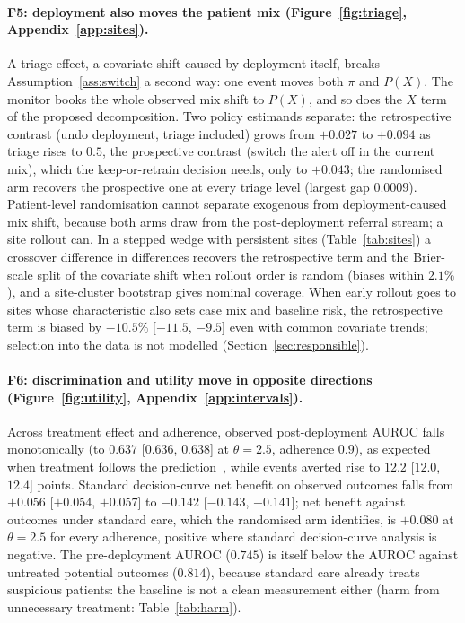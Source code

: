 \documentclass[letterpaper]{article} %
\begin{document}
\paragraph{F5: deployment also moves the patient mix
(Figure~\ref{fig:triage}, Appendix~\ref{app:sites}).} A triage effect, a
covariate shift caused by deployment itself, breaks Assumption~\ref{ass:switch}
a second way: one event moves both $\pi$ and $P(X)$. The monitor books the
whole observed mix shift to $P(X)$, and so does the $X$ term of the proposed
decomposition. Two policy
estimands separate: the retrospective contrast (undo deployment, triage
included) grows from $+0.027$ to $+0.094$ as triage rises to $0.5$, the
prospective contrast (switch the alert off in the current mix), which the
keep-or-retrain decision needs, only to $+0.043$; the randomised arm recovers
the prospective one at every triage level (largest gap $0.0009$). Patient-level
randomisation cannot separate exogenous from deployment-caused mix shift,
because both arms draw from the post-deployment referral stream; a site
rollout can. In a stepped wedge with persistent sites
(Table~\ref{tab:sites}) a crossover difference in
differences recovers the retrospective term and the Brier-scale split of the
covariate shift when rollout order is random (biases within $2.1\%$), and a
site-cluster bootstrap gives nominal coverage. When early rollout goes
to sites whose characteristic also sets case mix and baseline risk, the
retrospective term is biased by $-10.5\%$ [$-11.5$, $-9.5$] even with common
covariate trends; selection into the data is not modelled
(Section~\ref{sec:responsible}).

\paragraph{F6: discrimination and utility move in opposite directions
(Figure~\ref{fig:utility}, Appendix~\ref{app:intervals}).} Across treatment
effect and adherence, observed post-deployment AUROC falls monotonically (to
$0.637$ [$0.636$, $0.638$] at $\theta = 2.5$, adherence $0.9$), as expected
when treatment follows the prediction~\citep{pajouheshnia2017accounting},
while events averted rise to $12.2$ [$12.0$, $12.4$] points. Standard
decision-curve net benefit on observed outcomes falls from $+0.056$ [$+0.054$,
$+0.057$] to $-0.142$ [$-0.143$, $-0.141$]; net benefit against outcomes under standard care, which the
randomised arm identifies, is $+0.080$ at $\theta = 2.5$ for every adherence,
positive where standard decision-curve analysis is negative. The
pre-deployment AUROC ($0.745$) is itself below the AUROC against untreated
potential outcomes ($0.814$), because standard care already treats suspicious
patients: the baseline is not a clean measurement either
(harm from unnecessary treatment: Table~\ref{tab:harm}).
\end{document}

